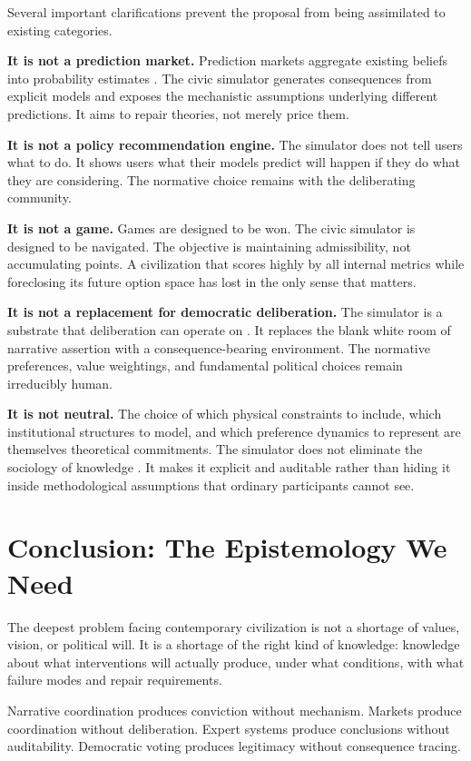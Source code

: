 \documentclass[12pt]{article}
\begin{document}
Several important clarifications prevent the proposal from being assimilated to existing categories.

\textbf{It is not a prediction market.} Prediction markets aggregate existing beliefs into probability estimates \cite{surowiecki2004}. The civic simulator generates consequences from explicit models and exposes the mechanistic assumptions underlying different predictions. It aims to repair theories, not merely price them.

\textbf{It is not a policy recommendation engine.} The simulator does not tell users what to do. It shows users what their models predict will happen if they do what they are considering. The normative choice remains with the deliberating community.

\textbf{It is not a game.} Games are designed to be won. The civic simulator is designed to be navigated. The objective is maintaining admissibility, not accumulating points. A civilization that scores highly by all internal metrics while foreclosing its future option space has lost in the only sense that matters.

\textbf{It is not a replacement for democratic deliberation.} The simulator is a substrate that deliberation can operate on \cite{habermas1984}. It replaces the blank white room of narrative assertion with a consequence-bearing environment. The normative preferences, value weightings, and fundamental political choices remain irreducibly human.

\textbf{It is not neutral.} The choice of which physical constraints to include, which institutional structures to model, and which preference dynamics to represent are themselves theoretical commitments. The simulator does not eliminate the sociology of knowledge \cite{latour1987}. It makes it explicit and auditable rather than hiding it inside methodological assumptions that ordinary participants cannot see.

\section{Conclusion: The Epistemology We Need}

The deepest problem facing contemporary civilization is not a shortage of values, vision, or political will. It is a shortage of the right kind of knowledge: knowledge about what interventions will actually produce, under what conditions, with what failure modes and repair requirements.

Narrative coordination produces conviction without mechanism. Markets produce coordination without deliberation. Expert systems produce conclusions without auditability. Democratic voting produces legitimacy without consequence tracing.
\end{document}
